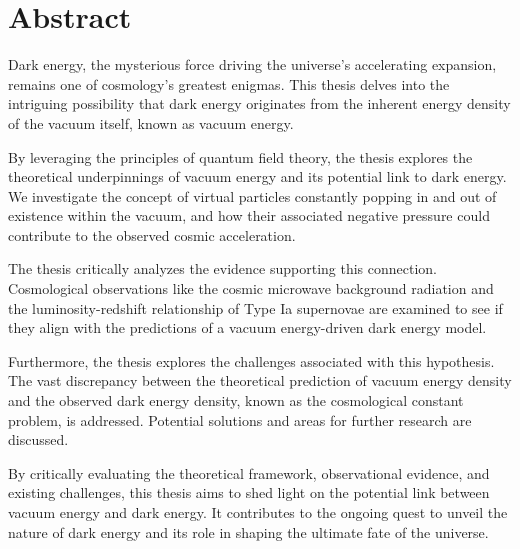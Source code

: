 \section{Abstract}

Dark energy, the mysterious force driving the universe's accelerating expansion, remains one of cosmology's greatest enigmas. This thesis delves into the intriguing possibility that dark energy originates from the inherent energy density of the vacuum itself, known as vacuum energy.

By leveraging the principles of quantum field theory, the thesis explores the theoretical underpinnings of vacuum energy and its potential link to dark energy.  We investigate the concept of virtual particles constantly popping in and out of existence within the vacuum, and how their associated negative pressure could contribute to the observed cosmic acceleration.

The thesis critically analyzes the evidence supporting this connection. Cosmological observations like the cosmic microwave background radiation and the luminosity-redshift relationship of Type Ia supernovae are examined to see if they align with the predictions of a vacuum energy-driven dark energy model.

Furthermore, the thesis explores the challenges associated with this hypothesis. The vast discrepancy between the theoretical prediction of vacuum energy density and the observed dark energy density, known as the cosmological constant problem, is addressed. Potential solutions and areas for further research are discussed.

By critically evaluating the theoretical framework, observational evidence, and existing challenges, this thesis aims to shed light on the potential link between vacuum energy and dark energy. It contributes to the ongoing quest to unveil the nature of dark energy and its role in shaping the ultimate fate of the universe.
